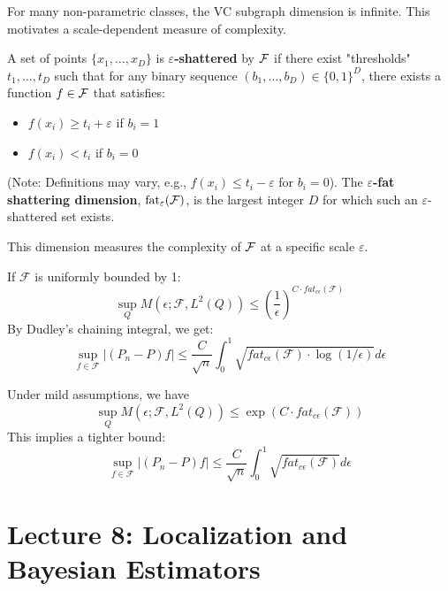 For many non-parametric classes, the VC subgraph dimension is infinite. This motivates a scale-dependent measure of complexity.

\begin{de}
A set of points $\{x_1, \dots, x_D\}$ is \textbf{$\varepsilon$-shattered} by $\mathcal{F}$ if there exist "thresholds" $t_1, \dots, t_D$ such that for any binary sequence $(b_1, \dots, b_D) \in \{0, 1\}^D$, there exists a function $f \in \mathcal{F}$ that satisfies:
\begin{itemize}
    \item $f(x_i) \ge t_i + \varepsilon$ if $b_i = 1$
    \item $f(x_i) < t_i$ if $b_i = 0$
\end{itemize}
(Note: Definitions may vary, e.g., $f(x_i) \le t_i - \varepsilon$ for $b_i=0$).
The \textbf{$\varepsilon$-fat shattering dimension}, $\operatorname{fat}_\varepsilon(\mathcal{F})$, is the largest integer $D$ for which such an $\varepsilon$-shattered set exists.
\end{de}

This dimension measures the complexity of $\mathcal{F}$ at a specific scale $\varepsilon$.

\begin{thm}
If $\mathcal{F}$ is uniformly bounded by 1:
$$
\sup_Q M(\epsilon; \mathcal{F}, L^2(Q)) \le \left(\frac{1}{\epsilon}\right)^{C \cdot fat_{c\epsilon}(\mathcal{F})}
$$
By Dudley's chaining integral, we get:
$$
\sup_{f \in \mathcal{F}} |(P_n - P)f| \le \frac{C}{\sqrt{n}} \int_0^1 \sqrt{fat_{c\epsilon}(\mathcal{F}) \cdot \log(1/\epsilon)} d\epsilon
$$
\end{thm}

\begin{thm}
Under mild assumptions, we have
$$
\sup_Q M(\epsilon; \mathcal{F}, L^2(Q)) \le \exp\left( C \cdot fat_{c\epsilon}(\mathcal{F}) \right)
$$
This implies a tighter bound:
$$
\sup_{f \in \mathcal{F}} |(P_n - P)f| \le \frac{C}{\sqrt{n}} \int_0^1 \sqrt{fat_{c\epsilon}(\mathcal{F})} d\epsilon
$$
\end{thm}

\section{Lecture 8: Localization and Bayesian Estimators}
